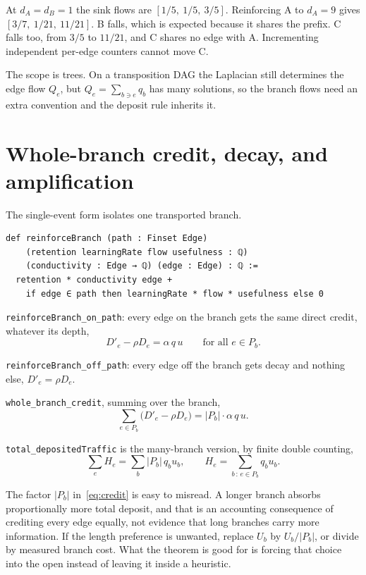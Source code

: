 \documentclass[11pt,a4paper]{article}
\theoremstyle{definition}
\newcommand{\lean}[1]{\texttt{#1}}
\begin{document}
At $d_A = d_B = 1$ the sink flows are $[1/5,\ 1/5,\ 3/5]$. Reinforcing A to
$d_A = 9$ gives $[3/7,\ 1/21,\ 11/21]$. B falls, which is expected because it
shares the prefix. C falls too, from $3/5$ to $11/21$, and C shares no edge
with A. Incrementing independent per-edge counters cannot move C.

The scope is trees. On a transposition DAG the Laplacian still determines the
edge flow $Q_e$, but $Q_e = \sum_{b \ni e} q_b$ has many solutions, so the
branch flows need an extra convention and the deposit rule inherits it.

\section{Whole-branch credit, decay, and amplification}

The single-event form isolates one transported branch.

\begin{Verbatim}[fontsize=\small,xleftmargin=1em]
def reinforceBranch (path : Finset Edge)
    (retention learningRate flow usefulness : ℚ)
    (conductivity : Edge → ℚ) (edge : Edge) : ℚ :=
  retention * conductivity edge +
    if edge ∈ path then learningRate * flow * usefulness else 0
\end{Verbatim}

\lean{reinforceBranch\_on\_path}: every edge on the branch gets the same direct
credit, whatever its depth,
\begin{equation}
  D'_e - \rho D_e = \alpha \, q \, u
  \qquad \text{for all } e \in P_b .
\end{equation}

\lean{reinforceBranch\_off\_path}: every edge off the branch gets decay and
nothing else, $D'_e = \rho D_e$.

\lean{whole\_branch\_credit}, summing over the branch,
\begin{equation}
  \sum_{e \in P_b} \big( D'_e - \rho D_e \big)
  = |P_b| \cdot \alpha \, q \, u .
  \label{eq:credit}
\end{equation}

\lean{total\_depositedTraffic} is the many-branch version, by finite double
counting,
\begin{equation}
  \sum_{e} H_e = \sum_{b} |P_b| \, q_b u_b ,
  \qquad H_e = \sum_{b \,:\, e \in P_b} q_b u_b .
\end{equation}

The factor $|P_b|$ in~\eqref{eq:credit} is easy to misread. A longer branch
absorbs proportionally more total deposit, and that is an accounting
consequence of crediting every edge equally, not evidence that long branches
carry more information. If the length preference is unwanted, replace $U_b$ by
$U_b / |P_b|$, or divide by measured branch cost. What the theorem is good for
is forcing that choice into the open instead of leaving it inside a heuristic.
\end{document}
